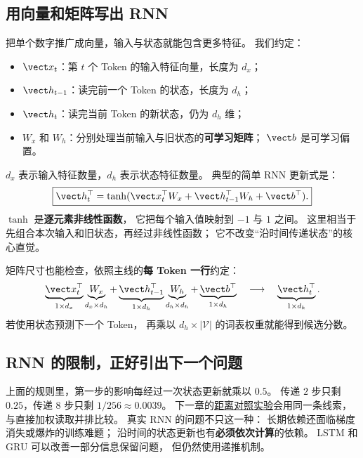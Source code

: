 \subsection{用向量和矩阵写出 RNN}
\label{concept:time-step}

把单个数字推广成向量，输入与状态就能包含更多特征。
我们约定：
\begin{itemize}
\item $\vect x_t$：第 $t$ 个 Token 的输入特征向量，长度为 $d_x$；
\item $\vect h_{t-1}$：读完前一个 Token 的状态，长度为 $d_h$；
\item $\vect h_t$：读完当前 Token 的新状态，仍为 $d_h$ 维；
\item $W_x$ 和 $W_h$：分别处理当前输入与旧状态的\textbf{可学习矩阵}；
$\vect b$ 是可学习偏置。
\end{itemize}
$d_x$ 表示输入特征数量，$d_h$ 表示状态特征数量。
典型的简单 RNN 更新式是：
\begin{equation}
\boxed{\vect h_t^\top=\tanh(\vect x_t^\top W_x+
\vect h_{t-1}^\top W_h+\vect b^\top).}
\label{eq:rnn-hidden}
\end{equation}
$\tanh$ 是\textbf{逐元素非线性函数}，
它把每个输入值映射到 $-1$ 与 $1$ 之间。
这里相当于先组合本次输入和旧状态，再经过非线性函数；
它不改变“沿时间传递状态”的核心直觉。

矩阵尺寸也能检查，依照主线的\textbf{每 Token 一行}约定：
\[
\underbrace{\vect x_t^\top}_{1\times d_x}
\underbrace{W_x}_{d_x\times d_h}
+
\underbrace{\vect h_{t-1}^\top}_{1\times d_h}
\underbrace{W_h}_{d_h\times d_h}
+\underbrace{\vect b^\top}_{1\times d_h}
\quad\longrightarrow\quad
\underbrace{\vect h_t^\top}_{1\times d_h}.
\]
若使用状态预测下一个 Token，
再乘以 $d_h\times|\mathcal V|$ 的词表权重就能得到候选分数。

\subsection{RNN 的限制，正好引出下一个问题}
\label{concept:long-term-dependency}
\label{concept:lstm}

上面的规则里，第一步的影响每经过一次状态更新就乘以 $0.5$。
传递 $2$ 步只剩 $0.25$，传递 $8$ 步只剩 $1/256\approx0.0039$。
下一章的\hyperref[experiment:distance-reading]{距离对照实验}会用同一条线索，与直接加权读取并排比较。
真实 RNN 的问题不只这一种：
长期依赖还面临梯度消失或爆炸的训练难题；
沿时间的状态更新也有\textbf{必须依次计算}的依赖。
LSTM 和 GRU 可以改善一部分信息保留问题，
但仍然使用递推机制。


